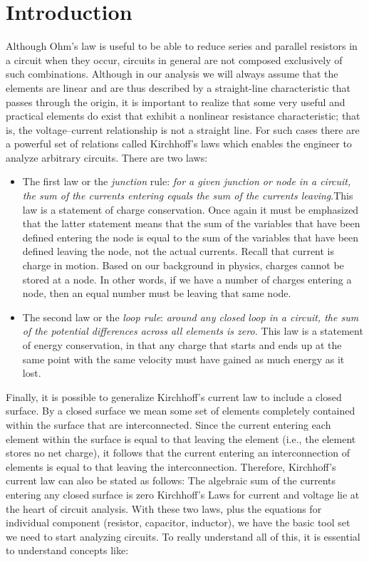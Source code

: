 \documentclass[a4paper]{article}
\begin{document}
\section{Introduction}
Although Ohm’s law is useful to be able to reduce series and parallel resistors in a circuit when they occur, circuits in general are not composed exclusively of such combinations. Although in our analysis we will always assume that the elements are linear and are thus described by a straight-line characteristic that passes through the origin, it is important to realize that some very useful and practical elements do exist that exhibit a nonlinear resistance characteristic; that is, the voltage–current relationship is not a straight line. For such cases there are a powerful set of relations called Kirchhoff's laws which enables the engineer to analyze arbitrary circuits. There are two laws:
\begin{itemize}
\item The first law or the \textit{junction} rule: \textit{for a given junction or node in a circuit, the sum of the currents entering equals the sum of the currents leaving}.This law is a statement of charge conservation. Once again it must be emphasized that the latter statement means that the sum of the variables that have been defined entering the node is equal to the sum of the variables that have been defined leaving the node, not the actual currents. Recall that current is charge in motion. Based on our background in physics, charges cannot be stored at a node. In other words, if we have a number of charges entering a node, then an equal number must be leaving that same node.

\item The second law or the \textit{loop rule}: \textit{around any closed loop in a circuit, the sum of the potential differences across all elements is zero.} This law is a statement of energy conservation, in that any charge that starts and ends up at the same point with the same velocity must have gained as much energy as it lost.
\end{itemize}
Finally, it is possible to generalize Kirchhoff's current law to include a closed surface. By a closed surface we mean some set of elements completely contained within the surface that are interconnected. Since the current entering each element within the surface is equal to that leaving the element (i.e., the element stores no net charge), it follows that the current entering an interconnection of elements is equal to that leaving the interconnection. Therefore, Kirchhoff's current law can also be stated as follows: The algebraic sum of the currents entering any closed surface is zero
Kirchhoff's Laws for current and voltage lie at the heart of circuit analysis. With these two laws, plus the equations for individual component (resistor, capacitor, inductor), we have the basic tool set we need to start analyzing circuits. To really understand all of this, it is essential to understand concepts like: 
 
\end{document}
